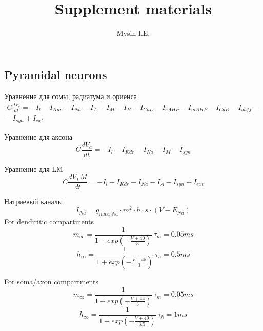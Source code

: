 \documentclass[12pt]{article}
\title{Supplement materials}
\date{}
\author{Mysin I.E.}
\begin{document}
\maketitle
\subsection{Pyramidal neurons}	
Уравнение для сомы, радиатума и ориенса
\begin{eqnarray}
C\frac{dV_s}{dt} = -I_l - I_{Kdr}-I_{Na} -I_A - I_M-I_H-I_{CaL} - I_{sAHP}-I_{mAHP} -I_{CaR}-I_{buff}-\nonumber \\
-I_{syn}+I_{ext}
\end{eqnarray}
\newline

Уравнение для аксона
\newline
	\begin{equation}
	C\frac{dV_a}{dt} = -I_l - I_{Kdr}-I_{Na}- I_M - I_{syn}
    \end{equation}
\newline

Уравнение для LM
\newline
\begin{equation}
C\frac{dV_LM}{dt} = -I_l - I_{Kdr}-I_{Na}- I_A - I_{syn} + I_{ext}
\end{equation}
\newline

Натриевый каналы
\newline
\begin{equation}
I_{Na} = g_{max, Na} \cdot m^2 \cdot h\cdot s \cdot(V - E_{Na})
\end{equation}
\newline
For dendiritic compartments
\newline
\begin{equation}
m_{\infty} = \frac{1}{1 + exp(-\frac{V + 40}{3})} \ 
\tau_m = 0.05 ms
\end{equation}
\newline
\begin{equation}
h_{\infty} = \frac{1}{1 + exp(-\frac{V + 45}{3})} \ 
\tau_h = 0.5 ms
\end{equation}
\newline

For soma/axon compartments
\begin{equation}
m_{\infty} = \frac{1}{1 + exp(-\frac{V + 44}{3})} \ 
\tau_m = 0.05 ms
\end{equation}
\newline
\begin{equation}
h_{\infty} = \frac{1}{1 + exp(-\frac{V + 49}{3.5})} \ 
\tau_h = 1 ms
\end{equation}
\newline
\end{document}
